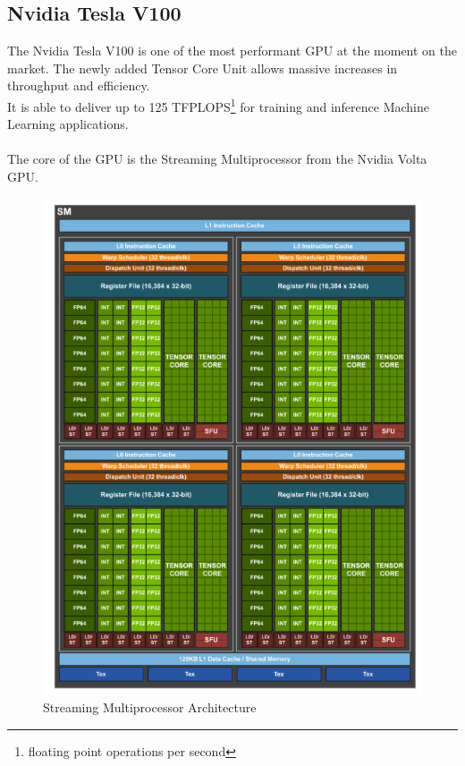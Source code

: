 \subsection{Nvidia Tesla V100}
The Nvidia Tesla V100 is one of the most performant GPU at the moment on the market. The newly added Tensor Core Unit allows massive increases in throughput and efficiency.\\It is able to deliver up to 125 TFPLOPS\footnote{floating point operations per second} for training and inference Machine Learning applications. \\\\

The core of the GPU is the Streaming Multiprocessor from the Nvidia Volta GPU.
\begin{figure}[!htbp]
\centering
\captionsetup{justification=centering}
\includegraphics[scale=0.9]{./figure/volta_sm_arch.PNG}
\caption{Streaming Multiprocessor Architecture}
\label{fig:voltasmarch}
\end{figure}

